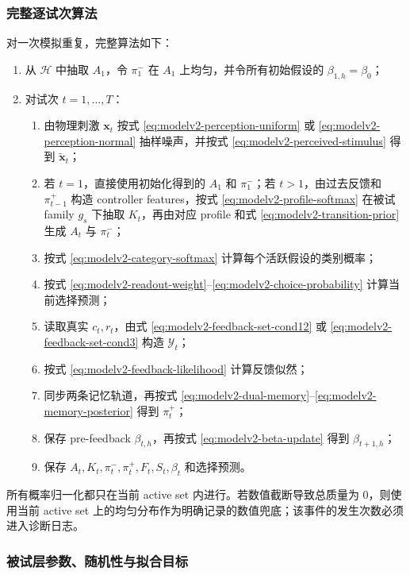 \subsubsection{完整逐试次算法}

对一次模拟重复，完整算法如下：
\begin{enumerate}
    \item 从 $\mathcal H$ 中抽取 $A_1$，令 $\pi_1^-$ 在 $A_1$ 上均匀，并令所有初始假设的 $\beta_{1,h}=\beta_0$；
    \item 对试次 $t=1,\ldots,T$：
    \begin{enumerate}
        \item 由物理刺激 $\mathbf x_t$ 按式 \ref{eq:modelv2-perception-uniform} 或 \ref{eq:modelv2-perception-normal} 抽样噪声，并按式 \ref{eq:modelv2-perceived-stimulus} 得到 $\widetilde{\mathbf x}_t$；
        \item 若 $t=1$，直接使用初始化得到的 $A_1$ 和 $\pi_1^-$；若 $t>1$，由过去反馈和 $\pi_{t-1}^+$ 构造 controller features，按式 \ref{eq:modelv2-profile-softmax} 在被试 family $g_s$ 下抽取 $K_t$，再由对应 profile 和式 \ref{eq:modelv2-transition-prior} 生成 $A_t$ 与 $\pi_t^-$；
        \item 按式 \ref{eq:modelv2-category-softmax} 计算每个活跃假设的类别概率；
        \item 按式 \ref{eq:modelv2-readout-weight}--\ref{eq:modelv2-choice-probability} 计算当前选择预测；
        \item 读取真实 $c_t,r_t$，由式 \ref{eq:modelv2-feedback-set-cond12} 或 \ref{eq:modelv2-feedback-set-cond3} 构造 $\mathcal Y_t$；
        \item 按式 \ref{eq:modelv2-feedback-likelihood} 计算反馈似然；
        \item 同步两条记忆轨道，再按式 \ref{eq:modelv2-dual-memory}--\ref{eq:modelv2-memory-posterior} 得到 $\pi_t^+$；
        \item 保存 pre-feedback $\beta_{t,h}$，再按式 \ref{eq:modelv2-beta-update} 得到 $\beta_{t+1,h}$；
        \item 保存 $A_t,K_t,\pi_t^-,\pi_t^+,F_t,S_t,\beta_t$ 和选择预测。
    \end{enumerate}
\end{enumerate}
所有概率归一化都只在当前 active set 内进行。若数值截断导致总质量为 0，则使用当前 active set 上的均匀分布作为明确记录的数值兜底；该事件的发生次数必须进入诊断日志。


\subsubsection{被试层参数、随机性与拟合目标}

